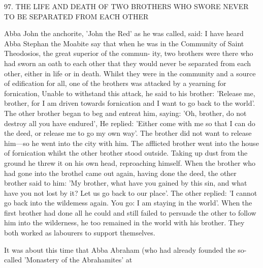 97. THE LIFE AND DEATH OF TWO BROTHERS
WHO SWORE NEVER TO BE SEPARATED FROM EACH OTHER

Abba John the anchorite, 'John the Red' as he was called, said: I
have heard Abba Stephan the Moabite say that when he was in the
Community of Saint Theodosios, the great superior of the commun-
ity, two brothers were there who had sworn an oath to each other
that they would never be separated from each other, either in life or
in death. Whilst they were in the community and a source of
edification for all, one of the brothers was attacked by a yearning
for fornication, Unable to withstand this attack, he said to his
brother: 'Release me, brother, for I am driven towards fornication
and I want to go back to the world'. The other brother began to
beg and entreat him, saying: 'Oh, brother, do not destroy all you
have endured', He replied: 'Either come with me so that I can do
the deed, or release me to go my own way'. The brother did not
want to release him—so he went into the city with him. The
afflicted brother went into the house of fornication whilst the other
brother stood outside. Taking up dust from the ground he threw it
on his own head, reproaching himself. When the brother who had
gone into the brothel came out again, having done the deed, the
other brother said to him: 'My brother, what have you gained by
this sin, and what have you not lost by it? Let us go back to our
place'. The other replied: 'I cannot go back into the wildemess
again. You go: I am staying in the world'. When the first brother
had done all he could and still failed to persuade the other to follow
him into the wilderness, he too remained in the world with his
brother. They both worked as labourers to support themselves.

It was about this time that Abba Abraham (who had already
founded the so-called 'Monastery of the Abrahamites' at

